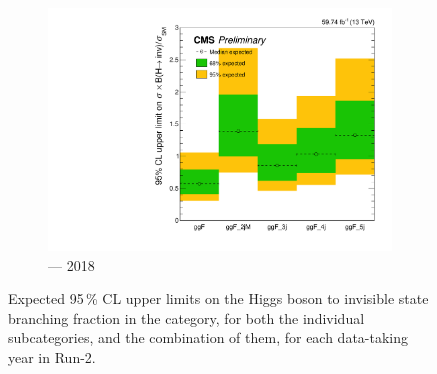 \begin{figure}[htbp]
    \begin{subfigure}[b]{0.45\textwidth}
        \includegraphics[width=\textwidth]{figures/limits/ggF/limit_2018_ggF_Scenario4.pdf}
        \caption{\ggH --- 2018}
    \end{subfigure}
    \caption[Expected 95\,\% CL upper limits on the Higgs boson to invisible state branching fraction in the \ggH category, for both the individual subcategories, and the combination of them, for each data-taking year in Run-2]{Expected 95\,\% CL upper limits on the Higgs boson to invisible state branching fraction in the \ggH category, for both the individual subcategories, and the combination of them, for each data-taking year in Run-2.}
    \label{fig:htoinv_limit_ggF}
\end{figure}

